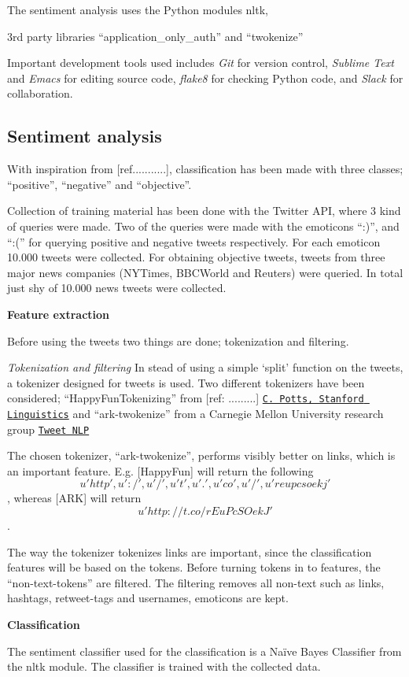 \documentclass[Main]{subfiles}
\begin{document}



The sentiment analysis uses the Python modules nltk, 

3rd party libraries ``application\_only\_auth'' and ``twokenize''

Important development tools used includes \textit{Git} for version control, \textit{Sublime Text} and \textit{Emacs} for editing source code, \textit{flake8} for checking Python code, and \textit{Slack} for collaboration.




\subsection{Sentiment analysis}


With inspiration from [ref...........], classification has been made with three classes; ``positive'', ``negative'' and ``objective''.

Collection of training material has been done with the Twitter API, where 3 kind of queries were made. Two of the queries were made with the emoticons ``:)'', and ``:('' for querying positive and negative tweets respectively. For each emoticon 10.000 tweets were collected. For obtaining objective tweets, tweets from three major news companies (NYTimes, BBCWorld and Reuters) were queried. In total just shy of 10.000 news tweets were collected. 

\textbf{Feature extraction}

Before using the tweets two things are done; tokenization and filtering.

\textit{Tokenization and filtering}
In stead of using a simple `split' function on the tweets, a tokenizer designed for tweets is used. Two different tokenizers have been considered; ``HappyFunTokenizing'' from [ref: .........] \href{http://sentiment.christopherpotts.net/tokenizing.html}{\tt C. Potts, Stanford Linguistics} and ``ark-twokenize'' from a Carnegie Mellon University research group \href{http://www.ark.cs.cmu.edu/TweetNLP/}{\tt Tweet NLP}

The chosen tokenizer, ``ark-twokenize'', performs visibly better on links, which is an important feature. E.g. [HappyFun] will return the following 
\[u'http', u':/', u'/', u't', u'.', u'co', u'/', u'reupcsoekj'\], whereas [ARK] will return \[u'http://t.co/rEuPcSOekJ'\].

The way the tokenizer tokenizes links are important, since the classification features will be based on the tokens. Before turning tokens in to features, the ``non-text-tokens'' are filtered. The filtering removes all non-text such as links, hashtags, retweet-tags and usernames, emoticons are kept. 


\textbf{Classification}

The sentiment classifier used for the classification is a Naïve Bayes Classifier from the nltk module. The classifier is trained with the collected data. 
\end{document}
